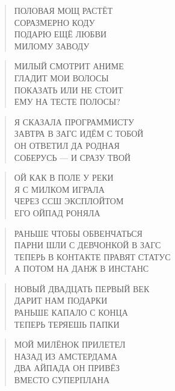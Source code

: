 \poemtitle{***}
\begin{verse}
ПОЛОВАЯ МОЩ РАСТЁТ\\
СОРАЗМЕРНО КОДУ\\
ПОДАРЮ ЕЩЁ ЛЮБВИ\\
МИЛОМУ ЗАВОДУ
\end{verse}

\poemtitle{***}
\begin{verse}
МИЛЫЙ СМОТРИТ АНИМЕ\\
ГЛАДИТ МОИ ВОЛОСЫ\\
ПОКАЗАТЬ ИЛИ НЕ СТОИТ\\
ЕМУ НА ТЕСТЕ ПОЛОСЫ?
\end{verse}

\poemtitle{***}
\begin{verse}
Я СКАЗАЛА ПРОГРАММИСТУ\\
ЗАВТРА В ЗАГС ИДЁМ С ТОБОЙ\\
ОН ОТВЕТИЛ ДА РОДНАЯ\\
СОБЕРУСЬ — И СРАЗУ ТВОЙ
\end{verse}

\poemtitle{***}
\begin{verse}
ОЙ КАК В ПОЛЕ У РЕКИ\\
Я С МИЛКОМ ИГРАЛА\\
ЧЕРЕЗ ССШ ЭКСПЛОЙТОМ\\
ЕГО ОЙПАД РОНЯЛА
\end{verse}

\poemtitle{***}
\begin{verse}
РАНЬШЕ ЧТОБЫ ОБВЕНЧАТЬСЯ\\
ПАРНИ ШЛИ С ДЕВЧОНКОЙ В ЗАГС\\
ТЕПЕРЬ В КОНТАКТЕ ПРАВЯТ СТАТУС\\
А ПОТОМ НА ДАНЖ В ИНСТАНС
\end{verse}

\poemtitle{***}
\begin{verse}
НОВЫЙ ДВАДЦАТЬ ПЕРВЫЙ ВЕК\\
ДАРИТ НАМ ПОДАРКИ\\
РАНЬШЕ КАПАЛО С КОНЦА\\
ТЕПЕРЬ ТЕРЯЕШЬ ПАПКИ
\end{verse}

\poemtitle{***}
\begin{verse}
МОЙ МИЛЁНОК ПРИЛЕТЕЛ\\
НАЗАД ИЗ АМСТЕРДАМА\\
ДВА АЙПАДА ОН ПРИВЁЗ\\
ВМЕСТО СУПЕРПЛАНА
\end{verse}


